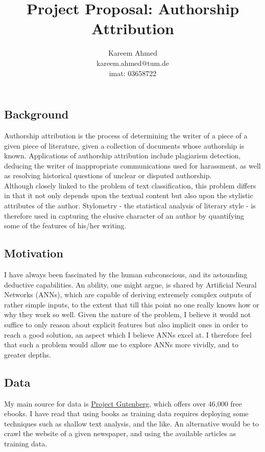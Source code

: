 \documentclass{article}
\title{Project Proposal: Authorship Attribution }
\author{Kareem Ahmed\\ kareem.ahmed@tum.de\\ imat: 03658722}
\begin{document}
\maketitle

\subsection*{Background}

Authorship attribution is the process of determining the writer of a piece of a given piece of literature, given a collection of documents whose authorship is known. Applications of authorship attribution include plagiarism detection, deducing the writer of inappropriate communications used for harassment, as well as resolving historical questions of unclear or disputed authorship.\\

Although closely linked to the problem of text classification, this problem differs in that it not only depends upon the textual content but also upon the stylistic attributes of the author. Stylometry - the statistical analysis of literary style - is therefore used in capturing the elusive character of an author by quantifying some of the features of his/her writing.

\subsection*{Motivation}

I have always been fascinated by the human subconscious, and its astounding deductive capabilities. An ability, one might argue, is shared by Artificial Neural Networks (ANNs), which are capable of deriving extremely complex outputs of rather simple inputs, to the extent that till this point no one really knows how or why they work so well. Given the nature of the problem, I believe it would not suffice to only reason about explicit features but also implicit ones in order to reach a good solution, an aspect which I believe ANNs excel at. I therefore feel that such a problem would allow me to explore ANNs more vividly, and to greater depths.

\subsection*{Data}
My main source for data is \href{https://www.gutenberg.org}{Project Gutenberg}, which offers over 46,000 free ebooks. I have read that using books as training data requires deploying some techniques such as shallow text analysis, and the like. An alternative would be to crawl the website of a given newspaper, and using the available articles as training data.
\end{document}
